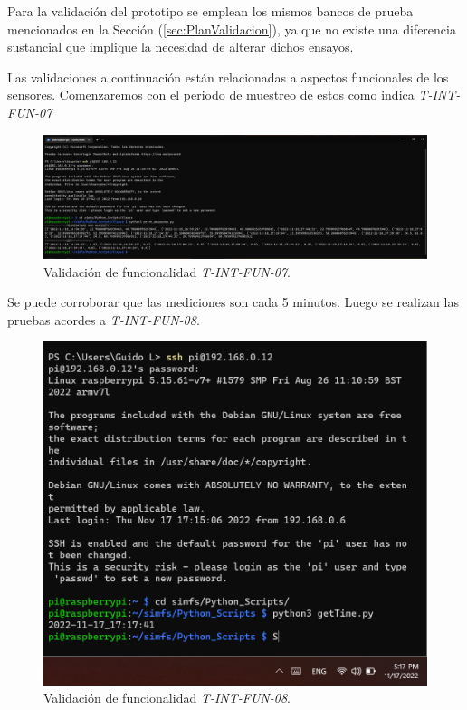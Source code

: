 Para la validación del prototipo se emplean los mismos bancos de prueba mencionados en la Sección (\ref{sec:PlanValidacion}), ya que no existe una diferencia sustancial que implique la necesidad de alterar dichos ensayos.


Las validaciones a continuación están relacionadas a aspectos funcionales de los sensores.
Comenzaremos con el periodo de muestreo de estos como indica \textit{T-INT-FUN-07}
\begin{figure}[H]
	\centering
    \includegraphics[width=1\linewidth]{ImagenesValidacion del prototipo/T-INT-FUN-07}
	\caption{Validación de funcionalidad \textit{T-INT-FUN-07}.}
\end{figure}

Se puede corroborar que las mediciones son cada 5 minutos. Luego se realizan las pruebas acordes a \textit{T-INT-FUN-08}.
\begin{figure}[H]
	\centering
    \includegraphics[width=0.8\linewidth]{ImagenesValidacion del prototipo/TINTFUN8}
	\caption{Validación de funcionalidad \textit{T-INT-FUN-08}.}
\end{figure}


